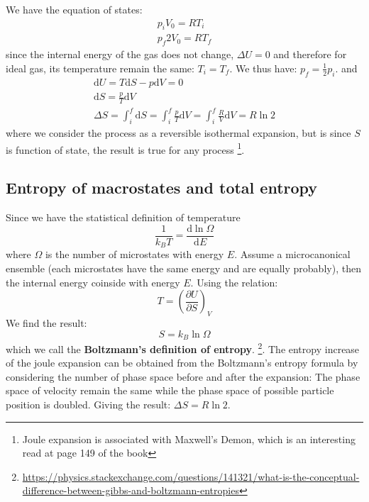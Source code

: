 \documentclass{article}
\newcommand{\pfrac}[2]{\frac{\partial #1}{\partial #2}}
\newcommand{\dnor}{\text{d}}
\begin{document}
We have the equation of states:
\begin{gather}
    p_i V_0 = RT_i \\
    p_f 2V_0 = RT_f
\end{gather}
since the internal energy of the gas does not change, $\Delta U = 0$ and therefore 
for ideal gas, its temperature remain the same: $T_i = T_f$. We thus have:
$p_f = \frac{1}{2} p_i$. and
\begin{gather}
    \dnor U = T \dnor S - p \dnor V = 0 \\
    \dnor S = \frac{p}{T} \dnor V \\ 
    \Delta S = \int_i^f \dnor S = \int_i^f \frac{p}{T} \dnor V = \int_i^f \frac{R}{V} \dnor V = R \ln2
\end{gather}
where we consider the process as a reversible isothermal expansion, but is since $S$ is function
of state, the result is true for any process
\footnote{
Joule expansion is associated with Maxwell's Demon, which is an interesting read at page 149 of the book
}.

\subsection{Entropy of macrostates and total entropy}
Since we have the statistical definition of temperature
\begin{equation}
    \frac{1}{k_BT} = \frac{\dnor \ln\Omega}{\dnor E}
\end{equation}
where $\Omega$ is the number of microstates with energy $E$. 
Assume a microcanonical ensemble (each microstates have the same energy
and are equally probably), then the internal energy coinside 
with energy $E$. Using the relation:
\begin{equation}
    T = \left( \pfrac{U}{S} \right)_V
\end{equation}
We find the result:
\begin{equation}
    S = k_B \ln \Omega
\end{equation}
which we call the \textbf{Boltzmann's definition of entropy}.
\footnote{\url{https://physics.stackexchange.com/questions/141321/what-is-the-conceptual-difference-between-gibbs-and-boltzmann-entropies}}.
The entropy increase of the joule expansion can be obtained from the Boltzmann's entropy formula
by considering the number of phase space before and after the expansion: The phase space of 
velocity remain the same while the phase space of possible particle position is doubled. Giving the 
result: $\Delta S = R \ln2$.
\end{document}
